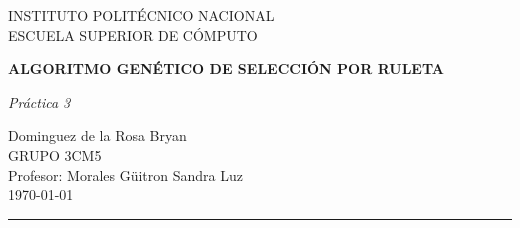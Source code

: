 \begin{titlepage}
\begin{center}
\begin{LARGE}
INSTITUTO POLITÉCNICO NACIONAL\\
\vspace*{0.15in}
ESCUELA SUPERIOR DE CÓMPUTO\\
\end{LARGE}
\vspace*{1.0in}
\begin{Large}
\textbf{ALGORITMO GENÉTICO DE SELECCIÓN POR RULETA} \\  
\end{Large}
\vspace*{0.2in}
\begin{large}
\textit{Práctica 3}\\
\end{large}
\vspace*{1.0in}
\begin{large}
Dominguez de la Rosa Bryan\\
\vspace*{2.0in}
GRUPO 3CM5\\
\vspace*{0.2in}
Profesor: Morales Güitron Sandra Luz\\
\vspace*{1.5in}
\today
\vspace*{0.3in}
\end{large}
\rule{150mm}{0.1mm}\\

\end{center}
\end{titlepage}
